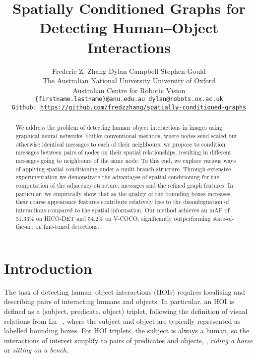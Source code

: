 \documentclass[10pt,twocolumn,letterpaper]{article}
\begin{document}
\title{Spatially Conditioned Graphs for Detecting Human--Object Interactions}

\author{Frederic Z. Zhang \quad Dylan Campbell \quad Stephen Gould \\
The Australian National University \quad University of Oxford \\ Australian Centre for Robotic Vision\\
{\tt\small \{firstname.lastname\}@anu.edu.au \quad dylan@robots.ox.ac.uk} \\
{\tt\small Github: \href{https://github.com/fredzzhang/spatially-conditioned-graphs}{https://github.com/fredzzhang/spatially-conditioned-graphs}}
}

\newcommand{\fz}[1]{\comment{FZ}{#1}}
\newcommand{\sg}[1]{\comment{SG}{#1}}
\newcommand{\dc}[1]{\comment{DC}{#1}}

\maketitle
\ificcvfinal\thispagestyle{empty}\fi

\begin{abstract}
   We address the problem of detecting human--object interactions in images using graphical neural networks. Unlike conventional methods, where nodes send scaled but otherwise identical messages to each of their neighbours, we propose to condition messages between pairs of nodes on their spatial relationships, resulting in different messages going to neighbours of the same node. To this end, we explore various ways of applying spatial conditioning under a multi-branch structure. Through extensive experimentation we demonstrate the advantages of spatial conditioning for the computation of the adjacency structure, messages and the refined graph features. In particular, we empirically show that as the quality of the bounding boxes increases, their coarse appearance features contribute relatively less to the disambiguation of interactions compared to the spatial information. Our method achieves an mAP of 31.33\% on HICO-DET and 54.2\% on V-COCO, significantly outperforming state-of-the-art on fine-tuned detections.
\end{abstract}

\section{Introduction}

The task of detecting human--object interactions (HOIs) requires localising and describing pairs of interacting humans and objects. In particular, an HOI is defined as a (subject, predicate, object) triplet, following the definition of visual relations from Lu \etal~\cite{lu2016}, where the subject and object are typically represented as labelled bounding boxes. For HOI triplets, the subject is always a human, so the interactions of interest simplify to pairs of predicates and objects, \eg, \textit{riding a horse} or \textit{sitting on a bench}.
\end{document}
